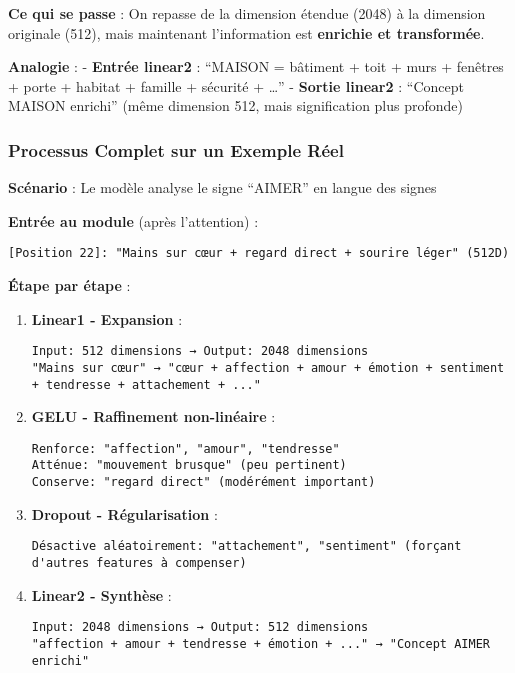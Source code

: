 \documentclass[12pt]{article}
\begin{document}
\textbf{Ce qui se passe} : On repasse de la dimension étendue (2048) à
la dimension originale (512), mais maintenant l'information est
\textbf{enrichie et transformée}.

\textbf{Analogie} : - \textbf{Entrée linear2} : ``MAISON = bâtiment +
toit + murs + fenêtres + porte + habitat + famille + sécurité +
\ldots{}'' - \textbf{Sortie linear2} : ``Concept MAISON enrichi'' (même
dimension 512, mais signification plus profonde)

\subsubsection{Processus Complet sur un Exemple
Réel}\label{processus-complet-sur-un-exemple-ruxe9el}

\textbf{Scénario} : Le modèle analyse le signe ``AIMER'' en langue des
signes

\textbf{Entrée au module} (après l'attention) :

\begin{verbatim}
[Position 22]: "Mains sur cœur + regard direct + sourire léger" (512D)
\end{verbatim}

\textbf{Étape par étape} :

\begin{enumerate}
\def\labelenumi{\arabic{enumi}.}
\item
  \textbf{Linear1 - Expansion} :

\begin{verbatim}
Input: 512 dimensions → Output: 2048 dimensions
"Mains sur cœur" → "cœur + affection + amour + émotion + sentiment + tendresse + attachement + ..."
\end{verbatim}
\item
  \textbf{GELU - Raffinement non-linéaire} :

\begin{verbatim}
Renforce: "affection", "amour", "tendresse"  
Atténue: "mouvement brusque" (peu pertinent)
Conserve: "regard direct" (modérément important)
\end{verbatim}
\item
  \textbf{Dropout - Régularisation} :

\begin{verbatim}
Désactive aléatoirement: "attachement", "sentiment" (forçant d'autres features à compenser)
\end{verbatim}
\item
  \textbf{Linear2 - Synthèse} :

\begin{verbatim}
Input: 2048 dimensions → Output: 512 dimensions
"affection + amour + tendresse + émotion + ..." → "Concept AIMER enrichi"
\end{verbatim}
\end{enumerate}
\end{document}
